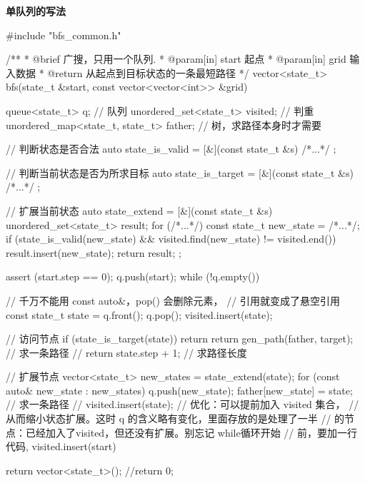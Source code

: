 \textbf{单队列的写法}

\begin{Codex}[label=bfs_template.cpp]
#include "bfs_common.h"

/**
 * @brief 广搜，只用一个队列.
 * @param[in] start 起点
 * @param[in] grid 输入数据
 * @return 从起点到目标状态的一条最短路径
 */
vector<state_t> bfs(state_t &start, const vector<vector<int>> &grid) {
    queue<state_t> q; // 队列
    unordered_set<state_t> visited; // 判重
    unordered_map<state_t, state_t> father; // 树，求路径本身时才需要

    // 判断状态是否合法
    auto state_is_valid = [&](const state_t &s) { /*...*/ };

    // 判断当前状态是否为所求目标
    auto state_is_target = [&](const state_t &s) { /*...*/ };

    // 扩展当前状态
    auto state_extend = [&](const state_t &s) {
        unordered_set<state_t> result;
        for (/*...*/) {
            const state_t new_state = /*...*/;
            if (state_is_valid(new_state) && 
                    visited.find(new_state) != visited.end()) {
                result.insert(new_state);
            }
        }
        return result;
    };

    assert (start.step == 0);
    q.push(start);
    while (!q.empty()) {
        // 千万不能用 const auto&，pop() 会删除元素，
        // 引用就变成了悬空引用
        const state_t state = q.front();
        q.pop();
        visited.insert(state);

        // 访问节点
        if (state_is_target(state)) {
            return return gen_path(father, target); // 求一条路径
            // return state.step + 1; // 求路径长度
        }

        // 扩展节点
        vector<state_t> new_states = state_extend(state);
        for (const auto& new_state : new_states) {
            q.push(new_state);
            father[new_state] = state;  // 求一条路径
            // visited.insert(state); // 优化：可以提前加入 visited 集合，
            // 从而缩小状态扩展。这时 q 的含义略有变化，里面存放的是处理了一半
            // 的节点：已经加入了visited，但还没有扩展。别忘记 while循环开始
            // 前，要加一行代码, visited.insert(start)
        }
    }

    return vector<state_t>();
    //return 0;
}
\end{Codex}


